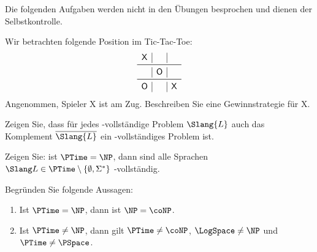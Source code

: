 \documentclass[german]{latteachCD}[2017/03/28]
\begin{document}
\maketitle

\begin{mdframed}
  Die folgenden Aufgaben werden nicht in den Übungen besprochen und dienen der
  Selbstkontrolle.

  \renewcommand{\theexercise}{\BoldGreek{exercise}}
  \setcounter{exercise}{5}

  \begin{exercise}
    Wir betrachten folgende Position im Tic-Tac-Toe:
    \begin{equation*}
      \begin{array}{c|c|c}
        \mathsf{X}&& \\\midrule
                  &\mathsf{O}& \\\midrule
        \mathsf{O}&&\mathsf{X}
      \end{array}
    \end{equation*}
    Angenommen, Spieler \textsf{X} ist am Zug.  Beschreiben Sie eine
    Gewinnstrategie für \textsf{X}.
  \end{exercise}

  \begin{exercise}
    Zeigen Sie, dass für jedes \PSpace-vollständige Problem $\Slang{L}$ auch das
    Komplement $\overline{\Slang{L}}$ ein \PSpace-vollständiges Problem ist.
  \end{exercise}

  \begin{exercise}
    Zeigen Sie: ist $\PTime = \NP$, dann sind alle Sprachen $\Slang L \in \PTime
    \setminus \{\emptyset, \Sigma^{*}\}$ \NP-vollständig.
  \end{exercise}

\end{mdframed}

\vspace*{0.5\baselineskip}

\setcounter{exercise}{0}

\enlargethispage{3\baselineskip}

\begin{exercise}
  Begründen Sie folgende Aussagen:
  \begin{enumerate}
  \item Ist $\PTime = \NP$, dann ist $\NP = \coNP$.
  \item Ist $\PTime \neq \NP$, dann gilt $\PTime \neq \coNP$, $\LogSpace \neq
    \NP$ und $\PTime \neq \PSpace$.
  \end{enumerate}
\end{exercise}
\end{document}
